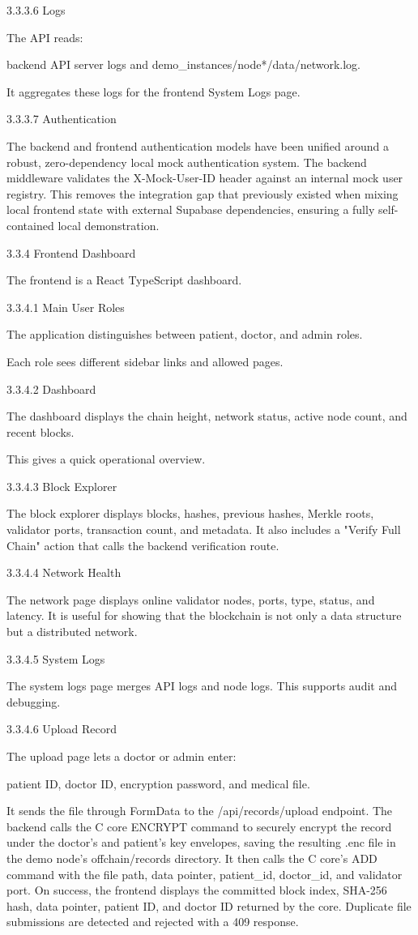 \documentclass[12pt]{article}
\begin{document}
3.3.3.6 Logs

The API reads:

 backend API server logs and demo\_instances/node*/data/network.log.

It aggregates these logs for the frontend System Logs page.

3.3.3.7 Authentication

The backend and frontend authentication models have been unified around a robust, zero-dependency local mock authentication system. The backend middleware validates the X-Mock-User-ID header against an internal mock user registry. This removes the integration gap that previously existed when mixing local frontend state with external Supabase dependencies, ensuring a fully self-contained local demonstration.

3.3.4 Frontend Dashboard

The frontend is a React TypeScript dashboard.

3.3.4.1 Main User Roles

The application distinguishes between patient, doctor, and admin roles.

Each role sees different sidebar links and allowed pages.

3.3.4.2 Dashboard

The dashboard displays the chain height, network status, active node count, and recent blocks.

This gives a quick operational overview.

3.3.4.3 Block Explorer

The block explorer displays blocks, hashes, previous hashes, Merkle roots, validator ports, transaction count, and metadata. It also includes a "Verify Full Chain" action that calls the backend verification route.

3.3.4.4 Network Health

The network page displays online validator nodes, ports, type, status, and latency. It is useful for showing that the blockchain is not only a data structure but a distributed network.

3.3.4.5 System Logs

The system logs page merges API logs and node logs. This supports audit and debugging.

3.3.4.6 Upload Record

The upload page lets a doctor or admin enter:

 patient ID, doctor ID, encryption password, and medical file.

It sends the file through FormData to the /api/records/upload endpoint. The backend calls the C core ENCRYPT command to securely encrypt the record under the doctor's and patient's key envelopes, saving the resulting .enc file in the demo node's offchain/records directory. It then calls the C core's ADD command with the file path, data pointer, patient\_id, doctor\_id, and validator port. On success, the frontend displays the committed block index, SHA-256 hash, data pointer, patient ID, and doctor ID returned by the core. Duplicate file submissions are detected and rejected with a 409 response.
\end{document}
